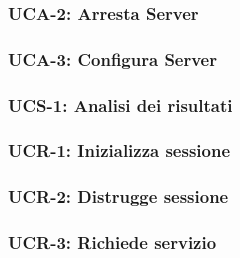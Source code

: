 \subsubsection{UCA-2: Arresta Server}

\pagebreak

\subsubsection{UCA-3: Configura Server}

\pagebreak

\subsubsection{UCS-1: Analisi dei risultati}

\pagebreak

\subsubsection{UCR-1: Inizializza sessione}

\pagebreak

\subsubsection{UCR-2: Distrugge sessione}

\pagebreak

\subsubsection{UCR-3: Richiede servizio}

\pagebreak




